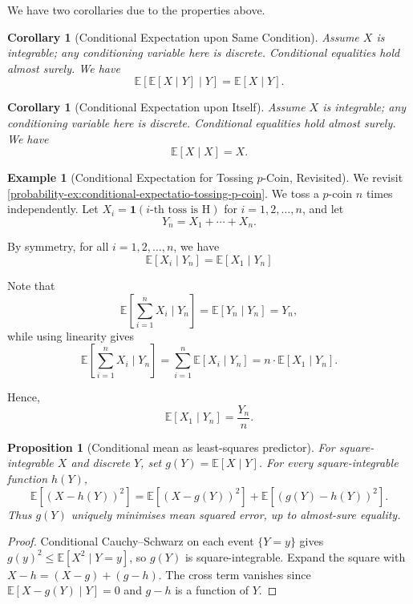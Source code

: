 \documentclass[11pt]{article}
\numberwithin{equation}{section}
\newtheorem{proposition}[theorem]{Proposition}
\newtheorem{corollary}[theorem]{Corollary}
\theoremstyle{definition}
\newtheorem{example}[theorem]{Example}
\theoremstyle{remark}
\newcommand{\pqty}[1]{\left(#1\right)}
\newcommand{\bqty}[1]{\left[#1\right]}
\newcommand{\indicator}{\mathbf 1}
\newcommand{\Expt}{\mathbb E}
\newcommand{\Conditional}[2]{#1\mid #2}
\begin{document}
We have two corollaries due to the properties above.

\begin{corollary}[Conditional Expectation upon Same Condition]\label{probability-corollary-005}
    \label{probability-cor:conditional-expecation-upon-same-condition}
Assume \(X\) is integrable; any conditioning variable here is discrete. Conditional equalities hold almost surely.
%
    We have
    \[
        \Expt\bqty{\Conditional{\Expt\bqty{\Conditional{X}{Y}}}{Y}} = \Expt\bqty{\Conditional{X}{Y}}.
    \]
\end{corollary}

\begin{corollary}[Conditional Expectation upon Itself]\label{probability-corollary-006}
    \label{probability-cor:conditional-expectation-upon-itself}
Assume \(X\) is integrable; any conditioning variable here is discrete. Conditional equalities hold almost surely.
%
    We have
    \[
        \Expt\bqty{\Conditional{X}{X}} = X.
    \]    
\end{corollary}

\begin{example}[Conditional Expectation for Tossing \(p\)-Coin, Revisited]\label{probability-example-028}
    \label{probability-ex:conditional-expectatio-tossing-p-coin-revisited}%
    We revisit \autoref{probability-ex:conditional-expectatio-tossing-p-coin}. We toss a \(p\)-coin \(n\) times independently. Let \(X_i = \indicator\pqty{i\text{-th toss is H}}\) for \(i = 1, 2, \ldots, n\), and let
    \[
        Y_n = X_1 + \cdots + X_n.
    \]

    By symmetry, for all \(i = 1, 2, \ldots, n\), we have
    \[
        \Expt\bqty{\Conditional{X_i}{Y_n}} = \Expt\bqty{\Conditional{X_1}{Y_n}}
    \]

    Note that
    \[
        \Expt\bqty{\Conditional{\sum_{i = 1}^{n} X_i}{Y_n}} = \Expt\bqty{\Conditional{Y_n}{Y_n}} = Y_n,
    \]
    while using linearity gives
    \[
        \Expt\bqty{\Conditional{\sum_{i = 1}^{n} X_i}{Y_n}} = \sum_{i = 1}^{n} \Expt\bqty{\Conditional{X_i}{Y_n}} = n \cdot \Expt\bqty{\Conditional{X_1}{Y_n}}.
    \]

    Hence,
    \[
        \Expt\bqty{\Conditional{X_1}{Y_n}} = \frac{Y_n}{n}.
    \]
\end{example}
\begin{proposition}[Conditional mean as least-squares predictor]\label{probability-proposition-023}
For square-integrable \(X\) and discrete \(Y\), set \(g(Y)=\Expt[X\mid Y]\).
For every square-integrable function \(h(Y)\),
\[\Expt[(X-h(Y))^2]=\Expt[(X-g(Y))^2]+\Expt[(g(Y)-h(Y))^2].\]
Thus \(g(Y)\) uniquely minimises mean squared error, up to almost-sure equality.
\end{proposition}
\begin{proof}\label{probability-proof-039}
Conditional Cauchy--Schwarz on each event \(\{Y=y\}\) gives
\(g(y)^2\le\Expt[X^2\mid Y=y]\), so \(g(Y)\) is square-integrable.
Expand the square with \(X-h=(X-g)+(g-h)\). The cross term vanishes since
\(\Expt[X-g(Y)\mid Y]=0\) and \(g-h\) is a function of \(Y\).
\end{proof}
\end{document}
